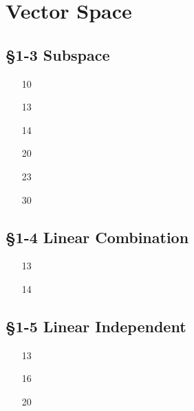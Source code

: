 


\cfoot{\thepage} %

\section{Vector Space}
	\subsection*{\S 1-3 Subspace} 
 
 \begin{enumerate}
   \item[10] 
   \item[13] 
   \item[14] 
   \item[20] 
   \item[23] 
   \item[30] 
   
 \end{enumerate}
 
 \subsection*{\S 1-4 Linear Combination}
 
 \begin{enumerate}
 	\item[13] 
   	\item[14] 
   
 \end{enumerate}
 
 \subsection*{\S 1-5 Linear Independent}
 
 \begin{enumerate}
 	\item[13] 
   	\item[16] 
   	\item[20] 
 \end{enumerate}
 
 



